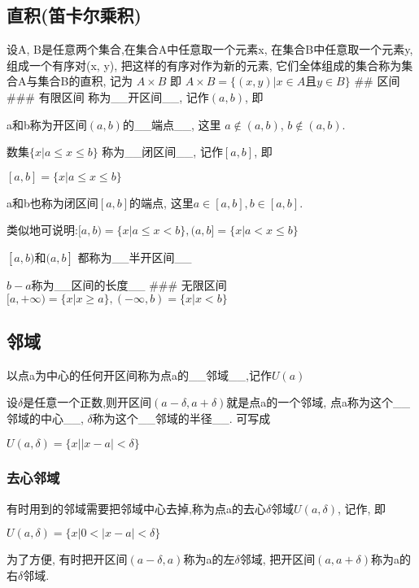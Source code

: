 \documentclass[11pt]{article}
\begin{document}
\subsection{直积(笛卡尔乘积)}\label{ux76f4ux79efux7b1bux5361ux5c14ux4e58ux79ef}

设A, B是任意两个集合,在集合A中任意取一个元素x, 在集合B中任意取一个元素y,
组成一个有序对(x, y), 把这样的有序对作为新的元素,
它们全体组成的集合称为集合A与集合B的直积, 记为 \(A \times B\) 即
\(A \times B=\{(x, y) | x \in A 且 y \in B\}\) \#\# 区间 \#\#\# 有限区间
称为\_\_开区间\_\_, 记作\((a,b)\), 即


a和b称为开区间\((a,b)\)的\_\_端点\_\_, 这里 \(a \notin (a,b)\),
\(b \notin (a,b)\).

数集\(\{x | a \leqslant x \leqslant b\}\) 称为\_\_闭区间\_\_,
记作\([a,b]\), 即

\([a,b] = \{x|a \leqslant x \leqslant b\}\)

a和b也称为闭区间\([a, b]\)的端点, 这里\(a \in [a, b], b \in [a, b]\).

类似地可说明:\([a, b)=\{x | a \leqslant x<b\} , (a, b]=\{x | a<x \leqslant b\}\)

\([a, b) 和(a, b]\) 都称为\_\_半开区间\_\_

\(b - a\)称为\_\_区间的长度\_\_ \#\#\# 无限区间
\([a,+\infty)=\{x | x \geqslant a\}, (-\infty, b)=\{x | x<b\}\)

\subsection{邻域}\label{ux90bbux57df}

以点a为中心的任何开区间称为点a的\_\_邻域\_\_,记作\(U(a)\)

设\(\delta\)是任意一个正数,则开区间\((a - \delta, a+ \delta)\)就是点a的一个邻域,
点a称为这个\_\_邻域的中心\_\_, \(\delta\)称为这个\_\_邻域的半径\_\_.
可写成

\(U(a, \delta)=\{x||x-a|<\delta \}\)

\subsubsection{去心邻域}\label{ux53bbux5fc3ux90bbux57df}

有时用到的邻域需要把邻域中心去掉,称为点a的去心\(\delta\)邻域\(U(a, \delta)\),
记作, 即

\(U(a, \delta)=\{x| 0<|x-a|<\delta \}\)

为了方便, 有时把开区间\((a - \delta, a)\)称为a的左\(\delta\)邻域,
把开区间\((a, a+ \delta)\)称为a的右\(\delta\)邻域.
\end{document}

